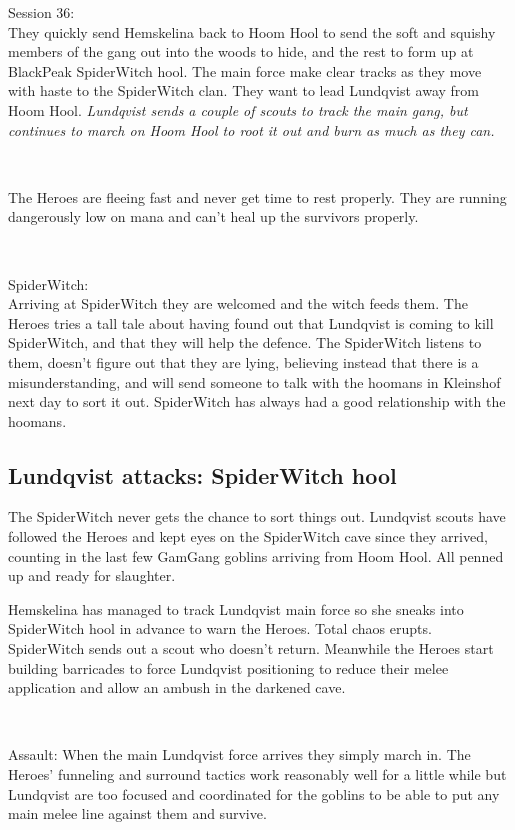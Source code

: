 \forceindent Session 36:\\                                              %
They quickly send Hemskelina back to Hoom Hool to send the soft and squishy members of the gang out into the woods to hide, and the rest to form up at BlackPeak SpiderWitch hool. The main force make clear tracks as they move with haste to the SpiderWitch clan. They want to lead Lundqvist away from Hoom Hool.
\emph{Lundqvist sends a couple of scouts to track the main gang, but continues to march on Hoom Hool to root it out and burn as much as they can.}

\

The Heroes are fleeing fast and never get time to rest properly. They are running dangerously low on mana and can't heal up the survivors properly.

\

SpiderWitch:\\
Arriving at SpiderWitch they are welcomed and the witch feeds them. The Heroes tries a tall tale about having found out that Lundqvist is coming to kill SpiderWitch, and that they will help the defence. The SpiderWitch listens to them, doesn't figure out that they are lying, believing instead that there is a misunderstanding, and will send someone to talk with the hoomans in Kleinshof next day to sort it out. SpiderWitch has always had a good relationship with the hoomans.


\subsection*{Lundqvist attacks: SpiderWitch hool}

The SpiderWitch never gets the chance to sort things out. Lundqvist scouts have followed the Heroes and kept eyes on the SpiderWitch cave since they arrived, counting in the last few GamGang goblins arriving from Hoom Hool. All penned up and ready for slaughter.

Hemskelina has managed to track Lundqvist main force so she sneaks into SpiderWitch hool in advance to warn the Heroes. Total chaos erupts. SpiderWitch sends out a scout who doesn't return. Meanwhile the Heroes start building barricades to force Lundqvist positioning to reduce their melee application and allow an ambush in the darkened cave.

\

Assault:
When the main Lundqvist force arrives they simply march in. The Heroes' funneling and surround tactics work reasonably well for a little while but Lundqvist are too focused and coordinated for the goblins to be able to put any main melee line against them and survive. 





